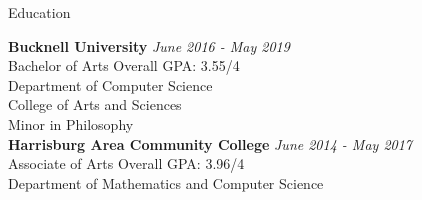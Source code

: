 \documentclass{resume} %
\begin{document}
\begin{rSection}{Education}

{\bf Bucknell University} \hfill {\em June 2016 - May 2019} 
\\ Bachelor of Arts \hfill { Overall GPA: 3.55/4}
\\ Department of Computer Science 
\\ College of Arts and Sciences
\\ Minor in Philosophy \smallskip \\


{\bf Harrisburg Area Community College} \hfill {\em June 2014 - May 2017} 
\\ Associate of Arts \hfill { Overall GPA: 3.96/4}
\\ Department of Mathematics and Computer Science 
\smallskip \\



\end{rSection}
\end{document}
